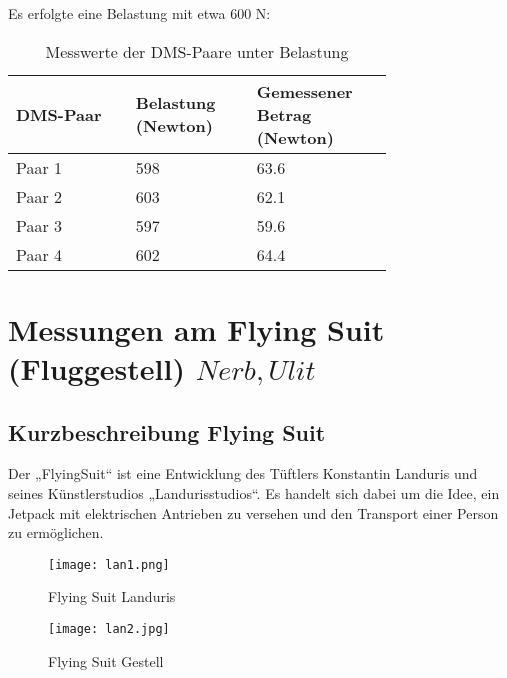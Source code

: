 Es erfolgte eine Belastung mit etwa 600 N:

\begin{table}[h]
    \centering
    \begin{tabular}{|p{0.25\linewidth}|p{0.25\linewidth}|p{0.25\linewidth}|}
    \hline
    \textbf{DMS-Paar} & \textbf{Belastung (Newton)} & \textbf{Gemessener Betrag (Newton)} \\ \hline
    Paar 1 & 598 & 63.6 \\ \hline
    Paar 2 & 603 & 62.1 \\ \hline
    Paar 3 & 597 & 59.6 \\ \hline
    Paar 4 & 602 & 64.4 \\ \hline
    \end{tabular}
    \caption{Messwerte der DMS-Paare unter Belastung}
    \label{tbl:dms_messwerte}
\end{table}





\clearpage
\section{Messungen am Flying Suit (Fluggestell) \(Nerb, Ulit\)}
\subsection{Kurzbeschreibung Flying Suit}
Der „FlyingSuit“ ist eine Entwicklung des Tüftlers Konstantin Landuris und seines Künstlerstudios „Landurisstudios“.
Es handelt sich dabei um die Idee, ein Jetpack mit elektrischen Antrieben zu versehen und den Transport einer Person zu ermöglichen.

\begin{figure}[htbp]
    \centering
    \begin{minipage}{0.48\textwidth}
        \centering
        \texttt{[image: lan1.png]}
        \caption[Flying Suit Landuris (Abbildungsverzeichnis)]{Flying Suit Landuris}
        \cite{Landuris}
        \label{fig:lan1}
    \end{minipage}
    \hfill
    \begin{minipage}{0.48\textwidth}
        \centering
        \texttt{[image: lan2.jpg]}
        \caption[Flying Suit Gestell (Abbildungsverzeichnis)]{Flying Suit Gestell}
        \cite{Landuris}

        \label{fig:lan2}
    \end{minipage}
\end{figure}

